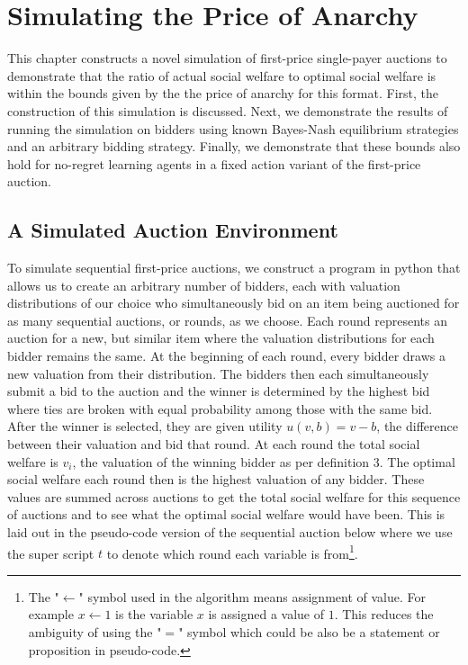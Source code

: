 \documentclass[12pt,twoside]{reedthesis}
\begin{document}
\chapter{Simulating the Price of Anarchy}

This chapter constructs a novel simulation of first-price single-payer auctions to demonstrate that the ratio of actual social welfare to optimal social welfare is within the bounds given by the the price of anarchy for this format. First, the construction of this simulation is discussed. Next, we demonstrate the results of running the simulation on bidders using known Bayes-Nash equilibrium strategies and an arbitrary bidding strategy. Finally, we demonstrate that these bounds also hold for no-regret learning agents in a fixed action variant of the first-price auction.

\section{A Simulated Auction Environment}

To simulate sequential first-price auctions, we construct a program in python that allows us to create an arbitrary number of bidders, each with valuation distributions of our choice who simultaneously bid on an item being auctioned for as many sequential auctions, or rounds, as we choose. Each round represents an auction for a new, but similar item where the valuation distributions for each bidder remains the same. At the beginning of each round, every bidder draws a new valuation from their distribution. The bidders then each simultaneously submit a bid to the auction and the winner is determined by the highest bid where ties are broken with equal probability among those with the same bid. After the winner is selected, they are given utility $u(v, b) = v - b$, the difference between their valuation and bid that round. At each round the total social welfare is $v_i$, the valuation of the winning bidder as per definition 3. %
The optimal social welfare each round then is the highest valuation of any bidder. These values are summed across auctions to get the total social welfare for this sequence of auctions and to see what the optimal social welfare would have been. This is laid out in the pseudo-code version of the sequential auction below where we use the super script $t$ to denote which round each variable is from\footnote{The "$\leftarrow$" symbol used in the algorithm means assignment of value. For example $x \leftarrow 1$ is the variable $x$ is assigned a value of $1$. This reduces the ambiguity of using the "$=$" symbol which could be also be a statement or proposition in pseudo-code.}.\\
\end{document}

